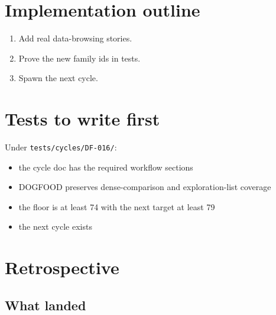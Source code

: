 \section{Implementation outline}\label{record-078-implementation-outline}

\begin{enumerate}
\def\labelenumi{\arabic{enumi}.}
\tightlist
\item
  Add real data-browsing stories.
\item
  Prove the new family ids in tests.
\item
  Spawn the next cycle.
\end{enumerate}

\section{Tests to write first}\label{record-078-tests-to-write-first}

Under \texttt{t\allowbreak{}e\allowbreak{}s\allowbreak{}t\allowbreak{}s\allowbreak{}/\allowbreak{}c\allowbreak{}y\allowbreak{}c\allowbreak{}l\allowbreak{}e\allowbreak{}s\allowbreak{}/\allowbreak{}D\allowbreak{}F\allowbreak{}-\allowbreak{}0\allowbreak{}1\allowbreak{}6\allowbreak{}/}:

\begin{itemize}
\tightlist
\item
  the cycle doc has the required workflow sections
\item
  DOGFOOD preserves dense-comparison and exploration-list coverage
\item
  the floor is at least 74 with the next target at least 79
\item
  the next cycle exists
\end{itemize}

\section{Retrospective}\label{record-078-retrospective}

\subsection{What landed}\label{record-078-what-landed}

